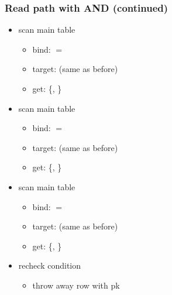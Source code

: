 \begin{frame}
  \frametitle{Read path with AND (continued)}
  \begin{itemize}
    \item scan main table
      \begin{itemize}
        \item bind:  $=$ 
        \item target: (same as before)
          \pause
        \item get: \{, \}
      \end{itemize}
      \pause
    \item scan main table
      \begin{itemize}
        \item bind:  $=$ 
        \item target: (same as before)
        \item get: \{, \}
      \end{itemize}
      \pause
    \item scan main table
      \begin{itemize}
        \item bind:  $=$ 
        \item target: (same as before)
        \item get: \{, \}
      \end{itemize}
      \pause
    \item recheck condition
      \pause
      \begin{itemize}
        \item throw away row with pk 
      \end{itemize}
  \end{itemize}
\end{frame}

